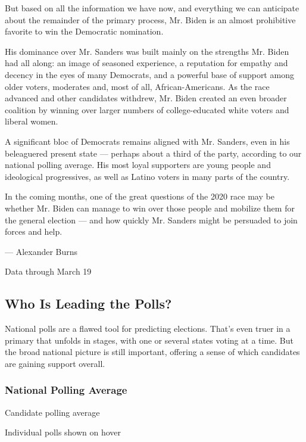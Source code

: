 But based on all the information we have now, and everything we can
anticipate about the remainder of the primary process, Mr. Biden is an
almost prohibitive favorite to win the Democratic nomination.

His dominance over Mr. Sanders was built mainly on the strengths Mr.
Biden had all along: an image of seasoned experience, a reputation for
empathy and decency in the eyes of many Democrats, and a powerful base
of support among older voters, moderates and, most of all,
African-Americans. As the race advanced and other candidates withdrew,
Mr. Biden created an even broader coalition by winning over larger
numbers of college-educated white voters and liberal women.

A significant bloc of Democrats remains aligned with Mr. Sanders, even
in his beleaguered present state --- perhaps about a third of the party,
according to our national polling average. His most loyal supporters are
young people and ideological progressives, as well as Latino voters in
many parts of the country.

In the coming months, one of the great questions of the 2020 race may be
whether Mr. Biden can manage to win over those people and mobilize them
for the general election --- and how quickly Mr. Sanders might be
persuaded to join forces and help.

--- Alexander Burns

Data through March 19

\hypertarget{who-is-leading-the-polls}{%
\subsection{Who Is Leading the Polls?}\label{who-is-leading-the-polls}}

National polls are a flawed tool for predicting elections. That's even
truer in a primary that unfolds in stages, with one or several states
voting at a time. But the broad national picture is still important,
offering a sense of which candidates are gaining support overall.

\hypertarget{national-polling-average}{%
\subsubsection{National Polling
Average}\label{national-polling-average}}

Candidate polling average

Individual polls shown on hover

